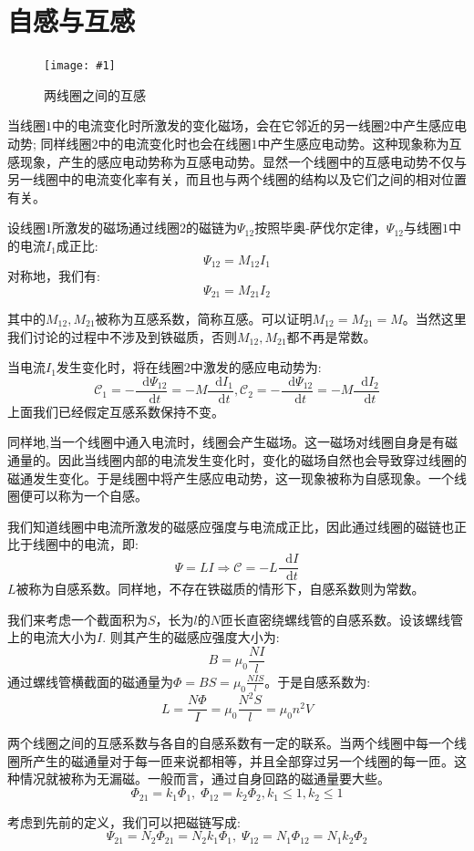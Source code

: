 \documentclass[12pt,a4paper,oneside]{report}
\theoremstyle{definition}
\theoremstyle{remark}
\newcommand{\insertfig}[3]{
    \begin{figure}[ht]
        \centering
        \texttt{[image: \#1]}
        \caption{#2}
        \label{fig:#1}
    \end{figure}
}
\renewcommand{\d}{\mathop{}\!\mathrm{d}}
\begin{document}
\section{自感与互感}
\insertfig{4-4.png}{两线圈之间的互感}{0.3}
当线圈$1$中的电流变化时所激发的变化磁场，会在它邻近的另一线圈$2$中产生感应电动势; 同样线圈$2$中的电流变化时也会在线圈$1$中产生感应电动势。这种现象称为互感现象，产生的感应电动势称为互感电动势。显然一个线圈中的互感电动势不仅与另一线圈中的电流变化率有关，而且也与两个线圈的结构以及它们之间的相对位置有关。

设线圈$1$所激发的磁场通过线圈$2$的磁链为$\Psi_{12}$按照毕奥-萨伐尔定律，$\Psi_{12}$与线圈$1$中的电流$I_1$成正比:
\[
\Psi_{12} = M_{12} I_1
\]
对称地，我们有:
\[
\Psi_{21} = M_{21} I_2
\]

其中的$M_{12},M_{21}$被称为互感系数，简称互感。可以证明$M_{12}=M_{21}=M$。当然这里我们讨论的过程中不涉及到铁磁质，否则$M_{12},M_{21}$都不再是常数。

当电流$I_1$发生变化时，将在线圈$2$中激发的感应电动势为:
\[
\mathscr C_1 = -\frac{\d \Psi_{12}}{\d t} = -M\frac{\d I_1}{\d t}, \mathscr C_2 = -\frac{\d \Psi_{12}}{\d t} = -M\frac{\d I_2}{\d t}
\]
上面我们已经假定互感系数保持不变。

同样地,当一个线圈中通入电流时，线圈会产生磁场。这一磁场对线圈自身是有磁通量的。因此当线圈内部的电流发生变化时，变化的磁场自然也会导致穿过线圈的磁通发生变化。于是线圈中将产生感应电动势，这一现象被称为自感现象。一个线圈便可以称为一个自感。

我们知道线圈中电流所激发的磁感应强度与电流成正比，因此通过线圈的磁链也正比于线圈中的电流，即:
\[
\Psi = LI \Rightarrow \mathscr C = -L\frac{\d I}{\d t}
\]
$L$被称为自感系数。同样地，不存在铁磁质的情形下，自感系数则为常数。

我们来考虑一个截面积为$S$，长为$l$的$N$匝长直密绕螺线管的自感系数。设该螺线管上的电流大小为$I$. 则其产生的磁感应强度大小为:
\[
B = \mu_0\frac{NI}{l}
\]
通过螺线管横截面的磁通量为$\Phi= BS=\mu_0\frac{NIS}{l}$。于是自感系数为:
\[
L =\frac{N\Phi}{I}=\mu_0\frac{N^2S}{l} = \mu_0 n^2 V
\]

两个线圈之间的互感系数与各自的自感系数有一定的联系。当两个线圈中每一个线圈所产生的磁通量对于每一匝来说都相等，并且全部穿过另一个线圈的每一匝。这种情况就被称为无漏磁。一般而言，通过自身回路的磁通量要大些。
\[
\Phi_{21} = k_1 \Phi_1, \;\Phi_{12} = k_2 \Phi_2, k_1\le 1, k_2\le 1
\]

考虑到先前的定义，我们可以把磁链写成:
\[
\Psi_{21} = N_2 \Phi_{21} = N_2 k_1 \Phi_1,\; \Psi_{12} = N_1 \Phi_{12} = N_1 k_2 \Phi_2
\]
\end{document}
